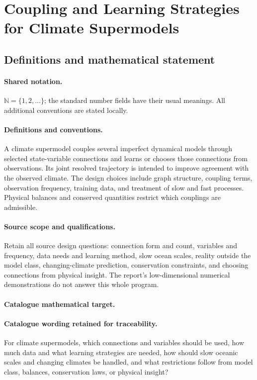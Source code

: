 \documentclass[11pt]{article}
\begin{document}
\section{Coupling and Learning Strategies for Climate Supermodels}\label{statement}

\subsection{Definitions and mathematical statement}

\paragraph{Shared notation.}$\mathbb N=\{1,2,\ldots\}$; the standard number fields have their usual meanings. All additional conventions are stated locally.


\paragraph{Definitions and conventions.} A climate supermodel couples several imperfect dynamical models through selected state-variable connections and learns or chooses those connections from observations. Its joint resolved trajectory is intended to improve agreement with the observed climate. The design choices include graph structure, coupling terms, observation frequency, training data, and treatment of slow and fast processes. Physical balances and conserved quantities restrict which couplings are admissible.

\paragraph{Source scope and qualifications.} Retain all source design questions: connection form and count, variables and frequency, data needs and learning method, slow ocean scales, reality outside the model class, changing-climate prediction, conservation constraints, and choosing connections from physical insight. The report's low-dimensional numerical demonstrations do not answer this whole program.

\paragraph{Catalogue mathematical target.}
\paragraph{Catalogue wording retained for traceability.}
For climate supermodels, which connections and variables should be used, how much data and what learning strategies are needed, how should slow oceanic scales and changing climates be handled, and what restrictions follow from model class, balances, conservation laws, or physical insight?
\end{document}
